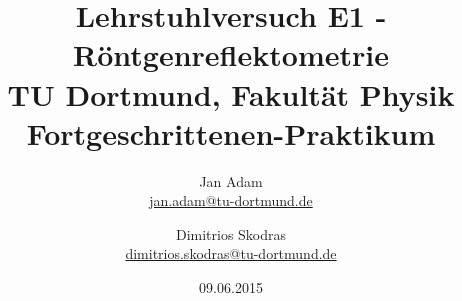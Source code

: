 



\title{Lehrstuhlversuch E1 - Röntgenreflektometrie\\				%
\large TU Dortmund, Fakultät Physik\\ 
\normalsize Fortgeschrittenen-Praktikum}

\author{Jan Adam\\			%
{\small \href{jan.adam@tu-dortmund.de}{jan.adam@tu-dortmund.de}}	%
\and						%
Dimitrios Skodras\\					%
{\small \href{dimitrios.skodras@tu-dortmund.de}{dimitrios.skodras@tu-dortmund.de}}		%
}
\date{09.06.2015}				%





\maketitle					%
\thispagestyle{empty} 				%



\tableofcontents


\newpage					%


